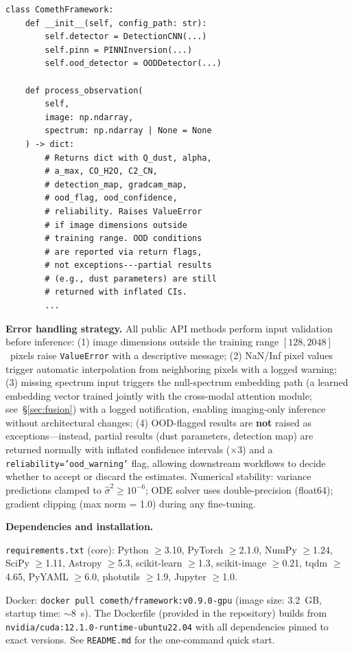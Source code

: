 \documentclass[usenatbib]{mnras}
\begin{document}
{\footnotesize
\begin{verbatim}
class ComethFramework:
    def __init__(self, config_path: str):
        self.detector = DetectionCNN(...)
        self.pinn = PINNInversion(...)
        self.ood_detector = OODDetector(...)

    def process_observation(
        self,
        image: np.ndarray,
        spectrum: np.ndarray | None = None
    ) -> dict:
        # Returns dict with Q_dust, alpha,
        # a_max, CO_H2O, C2_CN,
        # detection_map, gradcam_map,
        # ood_flag, ood_confidence,
        # reliability. Raises ValueError
        # if image dimensions outside
        # training range. OOD conditions
        # are reported via return flags,
        # not exceptions---partial results
        # (e.g., dust parameters) are still
        # returned with inflated CIs.
        ...
\end{verbatim}
}

\textbf{Error handling strategy.} All public API methods perform input validation before inference: (1) image dimensions outside the training range $[128, 2048]$~pixels raise {\tt ValueError} with a descriptive message; (2) NaN/Inf pixel values trigger automatic interpolation from neighboring pixels with a logged warning; (3) missing spectrum input triggers the null-spectrum embedding path (a learned embedding vector trained jointly with the cross-modal attention module; see~\S\ref{sec:fusion}) with a logged notification, enabling imaging-only inference without architectural changes; (4) OOD-flagged results are \textbf{not} raised as exceptions---instead, partial results (dust parameters, detection map) are returned normally with inflated confidence intervals ($\times 3$) and a {\tt reliability='ood\_warning'} flag, allowing downstream workflows to decide whether to accept or discard the estimates. Numerical stability: variance predictions clamped to $\hat{\sigma}^2 \geq 10^{-6}$; ODE solver uses double-precision (float64); gradient clipping (max norm = 1.0) during any fine-tuning.

\textbf{Dependencies and installation.}

{\tt requirements.txt} (core): Python $\geq$3.10, PyTorch $\geq$2.1.0, NumPy $\geq$1.24, SciPy $\geq$1.11, Astropy $\geq$5.3, scikit-learn $\geq$1.3, scikit-image $\geq$0.21, tqdm $\geq$4.65, PyYAML $\geq$6.0, photutils $\geq$1.9, Jupyter $\geq$1.0.

Docker: {\tt docker pull cometh/framework:v0.9.0-gpu} (image size: 3.2~GB, startup time: $\sim$8~s). The Dockerfile (provided in the repository) builds from {\tt nvidia/cuda:12.1.0-runtime-ubuntu22.04} with all dependencies pinned to exact versions. See {\tt README.md} for the one-command quick start.
\end{document}
